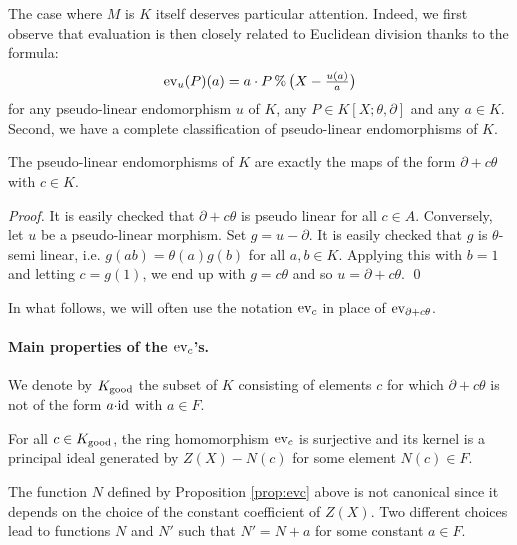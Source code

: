 \documentclass[a4paper]{llncs}
\newcommand{\id}{\textrm{\rm id}}
\newcommand{\ev}[1]{\textrm{\rm ev}_{#1}}
\renewcommand{\mod}{\,\%\,}
\newcommand{\good}{\textrm{\rm good}}
\begin{document}
The case where $M$ is $K$ itself deserves particular attention.
Indeed, we first observe that evaluation is then closely related to
Euclidean division thanks to the formula:
\begin{equation}
\label{eq:evanddiv}
\textstyle \ev{u}(P)(a) = 
a \cdot P \mod \big(X - \frac{u(a)}{a}\big)
\end{equation}
for any pseudo-linear endomorphism $u$ of $K$, any $P \in K[X;\theta,
\partial]$ and any $a \in K$. Second, we have a complete classification
of pseudo-linear endomorphisms of $K$.

\begin{proposition}
The pseudo-linear endomorphisms of $K$ are exactly the maps of
the form $\partial + c\theta$ with $c \in K$.
\end{proposition}

\begin{proof}
It is easily checked that $\partial + c\theta$ is pseudo linear
for all $c\in A$. Conversely, let $u$ be a pseudo-linear morphism.
Set $g = u - \partial$. It is easily checked that $g$ is 
$\theta$-semi linear, i.e. $g(ab) = \theta(a) g(b)$ for all $a, b 
\in K$. Applying this with $b = 1$ and letting $c = g(1)$, we end
up with $g = c \theta$ and so $u = \partial + c\theta$. \qed
\end{proof}

In what follows, we will often use the notation $\ev c$ in place of 
$\ev{\partial + c \theta}$.

\paragraph{Main properties of the $\ev c$'s.}

We denote by $K_\good$ the subset of $K$ consisting of elements $c$ for 
which $\partial + c\theta$ is not of the form $a{\cdot}\id$ with $a \in 
F$.

\begin{proposition}
\label{prop:evc}
For all $c \in K_\good$, the ring homomorphism $\ev{c}$ is surjective
and its kernel is a principal ideal generated by $Z(X) - N(c)$
for some element $N(c) \in F$.
\end{proposition}

\begin{remark}
The function $N$ defined by Proposition \ref{prop:evc} above is not 
canonical since it depends on the choice of the constant coefficient 
of $Z(X)$. Two different choices lead to functions $N$ and $N'$ such
that $N' = N + a$ for some constant $a \in F$.
\end{remark}
\end{document}
